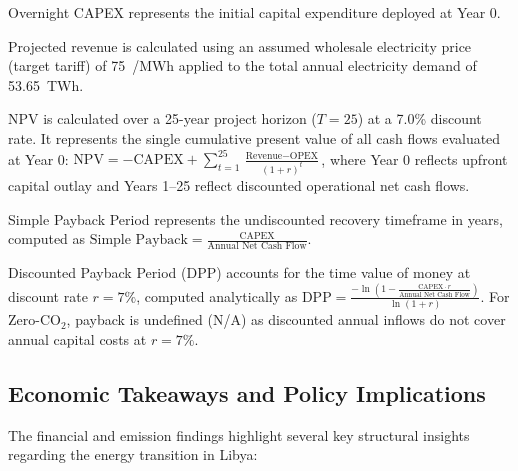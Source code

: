 \documentclass[preprint,12pt]{elsarticle}
\begin{document}
\begin{table}[htbp]
\begin{threeparttable}
\begin{tablenotes}
\footnotesize
\item[a] Overnight CAPEX represents the initial capital expenditure deployed at Year 0.
\item[b] Projected revenue is calculated using an assumed wholesale electricity price (target tariff) of 75~\texteuro/MWh applied to the total annual electricity demand of 53.65~TWh.
\item[c] NPV is calculated over a 25-year project horizon ($T = 25$) at a 7.0\% discount rate. It represents the single cumulative present value of all cash flows evaluated at Year 0: $\text{NPV} = -\text{CAPEX} + \sum_{t=1}^{25} \frac{\text{Revenue} - \text{OPEX}}{(1 + r)^t}$, where Year 0 reflects upfront capital outlay and Years 1--25 reflect discounted operational net cash flows.
\item[d] Simple Payback Period represents the undiscounted recovery timeframe in years, computed as $\text{Simple Payback} = \frac{\text{CAPEX}}{\text{Annual Net Cash Flow}}$.
\item[e] Discounted Payback Period (DPP) accounts for the time value of money at discount rate $r = 7\%$, computed analytically as $\text{DPP} = \frac{-\ln\left(1 - \frac{\text{CAPEX} \cdot r}{\text{Annual Net Cash Flow}}\right)}{\ln(1 + r)}$. For Zero-$\text{CO}_2$, payback is undefined (N/A) as discounted annual inflows do not cover annual capital costs at $r = 7\%$.
\end{tablenotes}
\end{threeparttable}
\end{table}

\subsection{Economic Takeaways and Policy Implications}
The financial and emission findings highlight several key structural insights regarding the energy transition in Libya:
\end{document}
